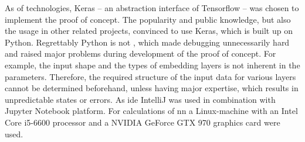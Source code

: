 As of technologies, Keras -- an abstraction interface of Tensorflow -- was chosen to implement the proof of concept.
The popularity and public knowledge, but also the usage in other related projects, convinced to use Keras, which is built up on Python.
Regrettably Python is not , which made debugging unnecessarily hard and raised major problems during development of the proof of concept.
For example, the input shape and the types of embedding layers is not inherent in the parameters.
Therefore, the required structure of the input data for various layers cannot be determined beforehand, unless having major expertise, which results in unpredictable states or errors.
As \gls{ide} IntelliJ was used in combination with Jupyter Notebook platform.
For calculations of \gls{nn} a Linux-machine with an Intel Core i5-6600 processor and a NVIDIA GeForce GTX 970 graphics card were used.


%







